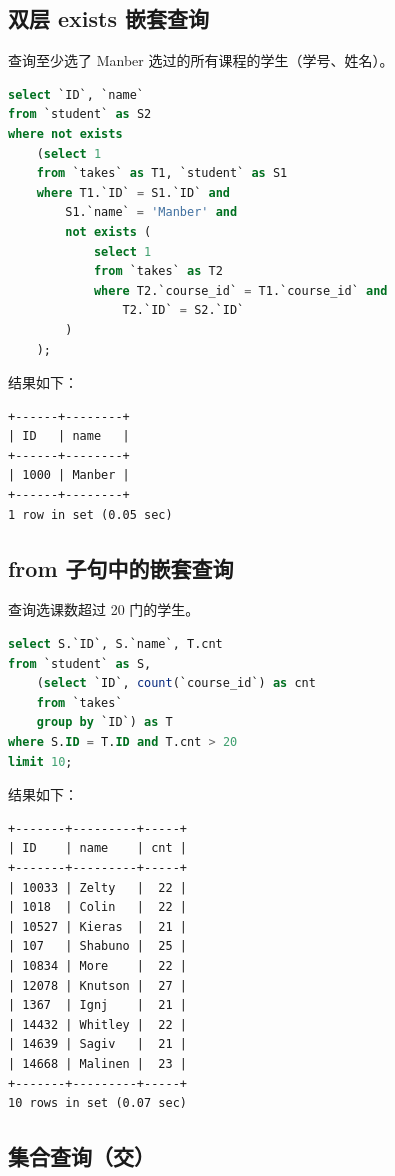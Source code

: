 \documentclass{article}
\begin{document}
\subsection{双层 exists 嵌套查询}

查询至少选了 Manber 选过的所有课程的学生（学号、姓名）。

\begin{lstlisting}[language=sql]
select `ID`, `name`
from `student` as S2
where not exists
	(select 1
    from `takes` as T1, `student` as S1
    where T1.`ID` = S1.`ID` and
		S1.`name` = 'Manber' and
        not exists (
			select 1
            from `takes` as T2
            where T2.`course_id` = T1.`course_id` and
				T2.`ID` = S2.`ID`
        )
	);
\end{lstlisting}

结果如下：

\begin{lstlisting}
+------+--------+
| ID   | name   |
+------+--------+
| 1000 | Manber |
+------+--------+
1 row in set (0.05 sec)
\end{lstlisting}

\subsection{from 子句中的嵌套查询}

查询选课数超过 20 门的学生。

\begin{lstlisting}[language=sql]
select S.`ID`, S.`name`, T.cnt
from `student` as S,
	(select `ID`, count(`course_id`) as cnt
    from `takes`
    group by `ID`) as T
where S.ID = T.ID and T.cnt > 20
limit 10;
\end{lstlisting}

结果如下：

\begin{lstlisting}
+-------+---------+-----+
| ID    | name    | cnt |
+-------+---------+-----+
| 10033 | Zelty   |  22 |
| 1018  | Colin   |  22 |
| 10527 | Kieras  |  21 |
| 107   | Shabuno |  25 |
| 10834 | More    |  22 |
| 12078 | Knutson |  27 |
| 1367  | Ignj    |  21 |
| 14432 | Whitley |  22 |
| 14639 | Sagiv   |  21 |
| 14668 | Malinen |  23 |
+-------+---------+-----+
10 rows in set (0.07 sec)
\end{lstlisting}

\subsection{集合查询（交）}
\end{document}
